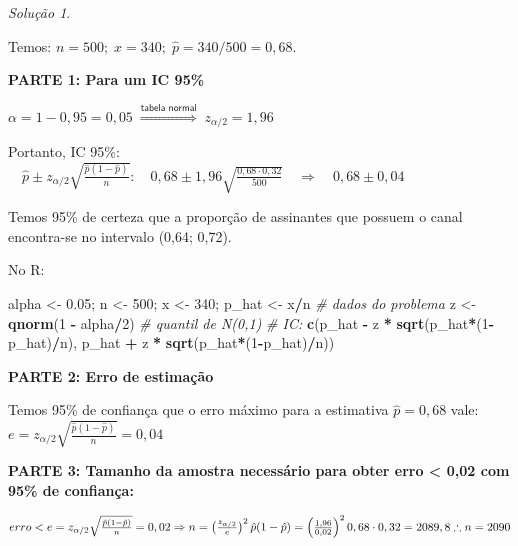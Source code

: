 \documentclass[
]{book}
\newenvironment{Shaded}{\begin{snugshade}}{\end{snugshade}}
\newcommand{\CommentTok}[1]{\textcolor[rgb]{0.56,0.35,0.01}{\textit{#1}}}
\newcommand{\DecValTok}[1]{\textcolor[rgb]{0.00,0.00,0.81}{#1}}
\newcommand{\FloatTok}[1]{\textcolor[rgb]{0.00,0.00,0.81}{#1}}
\newcommand{\KeywordTok}[1]{\textcolor[rgb]{0.13,0.29,0.53}{\textbf{#1}}}
\newcommand{\NormalTok}[1]{#1}
\newcommand{\OperatorTok}[1]{\textcolor[rgb]{0.81,0.36,0.00}{\textbf{#1}}}
\newcommand{\StringTok}[1]{\textcolor[rgb]{0.31,0.60,0.02}{#1}}
\theoremstyle{definition}
\theoremstyle{definition}
\theoremstyle{definition}
\theoremstyle{remark}
\newtheorem*{solution}{Solução}
\begin{document}
\begin{solution}
{}
\end{solution}

Temos: \(n = 500; \; x = 340;\; \hat{p} = 340/500 = 0,68\).

\textbf{PARTE 1: Para um IC 95\%}

\(\alpha = 1 - 0,95 = 0,05 \; \overset{\textsf{tabela normal}}{\Rightarrow} \; z_{\alpha/2} = 1,96\)

Portanto,
IC 95\%: \(\quad \hat{p} \pm z_{\alpha/2} \sqrt{\frac{\hat{p}(1-\hat{p})}{n}}: \quad 0,68 \pm 1,96 \sqrt{\frac{0,68 \cdot 0,32}{500}} \quad \Rightarrow \quad 0,68 \pm 0,04\)

Temos 95\% de certeza que a proporção de assinantes que possuem o canal encontra-se no intervalo (0,64; 0,72).

No R:

\begin{Shaded}
\begin{Highlighting}[]
\NormalTok{alpha <-}\StringTok{ }\FloatTok{0.05}\NormalTok{; n <-}\StringTok{ }\DecValTok{500}\NormalTok{; x <-}\StringTok{ }\DecValTok{340}\NormalTok{; p_hat <-}\StringTok{ }\NormalTok{x}\OperatorTok{/}\NormalTok{n  }\CommentTok{# dados do problema  }
\NormalTok{z <-}\StringTok{ }\KeywordTok{qnorm}\NormalTok{(}\DecValTok{1} \OperatorTok{-}\StringTok{ }\NormalTok{alpha}\OperatorTok{/}\DecValTok{2}\NormalTok{)  }\CommentTok{# quantil de N(0,1)  }
\CommentTok{# IC:}
\KeywordTok{c}\NormalTok{(p_hat }\OperatorTok{-}\StringTok{ }\NormalTok{z }\OperatorTok{*}\StringTok{ }\KeywordTok{sqrt}\NormalTok{(p_hat}\OperatorTok{*}\NormalTok{(}\DecValTok{1}\OperatorTok{-}\NormalTok{p_hat)}\OperatorTok{/}\NormalTok{n), p_hat }\OperatorTok{+}\StringTok{ }\NormalTok{z }\OperatorTok{*}\StringTok{ }\KeywordTok{sqrt}\NormalTok{(p_hat}\OperatorTok{*}\NormalTok{(}\DecValTok{1}\OperatorTok{-}\NormalTok{p_hat)}\OperatorTok{/}\NormalTok{n))}
\end{Highlighting}
\end{Shaded}

\textbf{PARTE 2: Erro de estimação}

Temos 95\% de confiança que o erro máximo para a estimativa \(\hat{p} = 0,68\) vale:\\
\(e = z_{\alpha/2}\sqrt{\frac{\hat{p}(1-\hat{p})}{n}} = 0,04\)

\textbf{PARTE 3: Tamanho da amostra necessário para obter erro \textless{} 0,02 com 95\% de confiança:}

\(erro < e = z_{\alpha/2}\sqrt{\frac{\hat{p}(1-\hat{p})}{n}} = 0,02 \\ \Rightarrow n = \left(\frac{z_{\alpha/2}}{e}\right)^2 \hat{p}(1-\hat{p}) = \left(\frac{1,96}{0,02}\right)^2 0,68\cdot 0,32 = 2089,8 \therefore n = 2090\)
\end{document}
